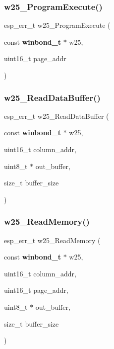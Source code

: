 \subsubsection{w25\+\_\+\+Program\+Execute()}
{\footnotesize\ttfamily esp\+\_\+err\+\_\+t w25\+\_\+\+Program\+Execute (\begin{DoxyParamCaption}\item[{const \textbf{ winbond\+\_\+t} $\ast$}]{w25,  }\item[{uint16\+\_\+t}]{page\+\_\+addr }\end{DoxyParamCaption})}

\mbox{\label{_w25_n01_g_v_8h_a84a181d8280eb384471aa3788b1c145f}} 
\subsubsection{w25\+\_\+\+Read\+Data\+Buffer()}
{\footnotesize\ttfamily esp\+\_\+err\+\_\+t w25\+\_\+\+Read\+Data\+Buffer (\begin{DoxyParamCaption}\item[{const \textbf{ winbond\+\_\+t} $\ast$}]{w25,  }\item[{uint16\+\_\+t}]{column\+\_\+addr,  }\item[{uint8\+\_\+t $\ast$}]{out\+\_\+buffer,  }\item[{size\+\_\+t}]{buffer\+\_\+size }\end{DoxyParamCaption})}

\mbox{\label{_w25_n01_g_v_8h_a8710f66229a2f0ceb05815251641e272}} 
\subsubsection{w25\+\_\+\+Read\+Memory()}
{\footnotesize\ttfamily esp\+\_\+err\+\_\+t w25\+\_\+\+Read\+Memory (\begin{DoxyParamCaption}\item[{const \textbf{ winbond\+\_\+t} $\ast$}]{w25,  }\item[{uint16\+\_\+t}]{column\+\_\+addr,  }\item[{uint16\+\_\+t}]{page\+\_\+addr,  }\item[{uint8\+\_\+t $\ast$}]{out\+\_\+buffer,  }\item[{size\+\_\+t}]{buffer\+\_\+size }\end{DoxyParamCaption})}

